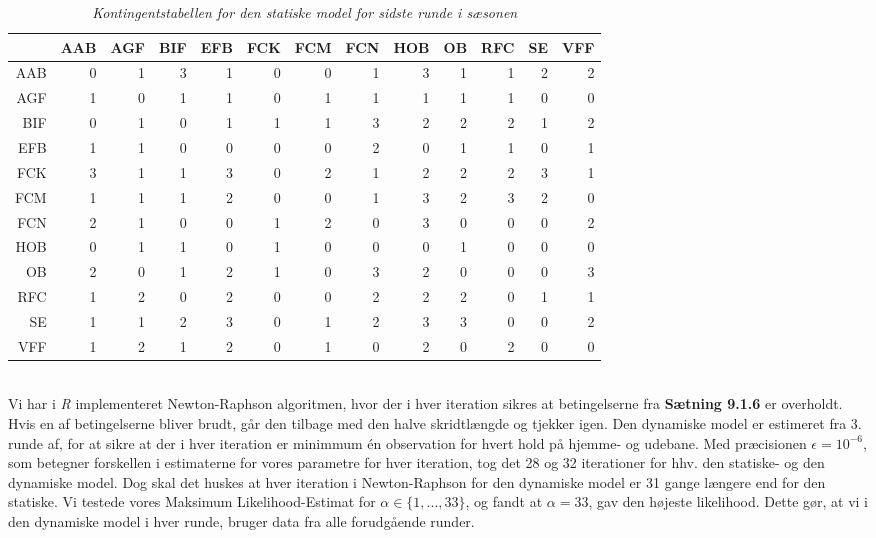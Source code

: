 \documentclass[11pt,a4paper]{article}
\begin{document}
\begin{table}[ht]
\centering
\begin{adjustbox}{max width=\textwidth}
\begin{tabular}{|rrrrrrrrrrrrr|}
  \hline
 & AAB & AGF & BIF & EFB & FCK & FCM & FCN & HOB & OB & RFC & SE & VFF \\ 
  \hline
AAB &   0 &   1 &   3 &   1 &   0 &   0 &   1 &   3 &   1 &   1 &   2 &   2 \\ 
  AGF &   1 &   0 &   1 &   1 &   0 &   1 &   1 &   1 &   1 &   1 &   0 &   0 \\ 
  BIF &   0 &   1 &   0 &   1 &   1 &   1 &   3 &   2 &   2 &   2 &   1 &   2 \\ 
  EFB &   1 &   1 &   0 &   0 &   0 &   0 &   2 &   0 &   1 &   1 &   0 &   1 \\ 
  FCK &   3 &   1 &   1 &   3 &   0 &   2 &   1 &   2 &   2 &   2 &   3 &   1 \\ 
  FCM &   1 &   1 &   1 &   2 &   0 &   0 &   1 &   3 &   2 &   3 &   2 &   0 \\ 
  FCN &   2 &   1 &   0 &   0 &   1 &   2 &   0 &   3 &   0 &   0 &   0 &   2 \\ 
  HOB &   0 &   1 &   1 &   0 &   1 &   0 &   0 &   0 &   1 &   0 &   0 &   0 \\ 
  OB &   2 &   0 &   1 &   2 &   1 &   0 &   3 &   2 &   0 &   0 &   0 &   3 \\ 
  RFC &   1 &   2 &   0 &   2 &   0 &   0 &   2 &   2 &   2 &   0 &   1 &   1 \\ 
  SE &   1 &   1 &   2 &   3 &   0 &   1 &   2 &   3 &   3 &   0 &   0 &   2 \\ 
  VFF &   1 &   2 &   1 &   2 &   0 &   1 &   0 &   2 &   0 &   2 &   0 &   0 \\ 
   \hline
\end{tabular}
\end{adjustbox}
\caption{\label{tab:Kontingentstabel}\textit{Kontingentstabellen for den statiske model for sidste runde i sæsonen}}
\end{table}
\\Vi har i \textit{R} implementeret Newton-Raphson algoritmen, hvor der i hver iteration sikres at betingelserne fra \textbf{Sætning 9.1.6} er overholdt. Hvis en af betingelserne bliver brudt, går den tilbage med den halve skridtlængde og tjekker igen. Den dynamiske model er estimeret fra 3. runde af, for at sikre at der i hver iteration er minimmum én observation for hvert hold på hjemme- og udebane. Med præcisionen $\epsilon = 10^{-6}$, som betegner forskellen i estimaterne for vores parametre for hver iteration, tog det 28 og 32 iterationer for hhv. den statiske- og den dynamiske model. Dog skal det huskes at hver iteration i Newton-Raphson for den dynamiske model er 31 gange længere end for den statiske. Vi testede vores Maksimum Likelihood-Estimat for $\alpha \in \{1,...,33\}$, og fandt at $\alpha=33$, gav den højeste likelihood. Dette gør, at vi i den dynamiske model i hver runde, bruger data fra alle forudgående runder. 
\end{document}
